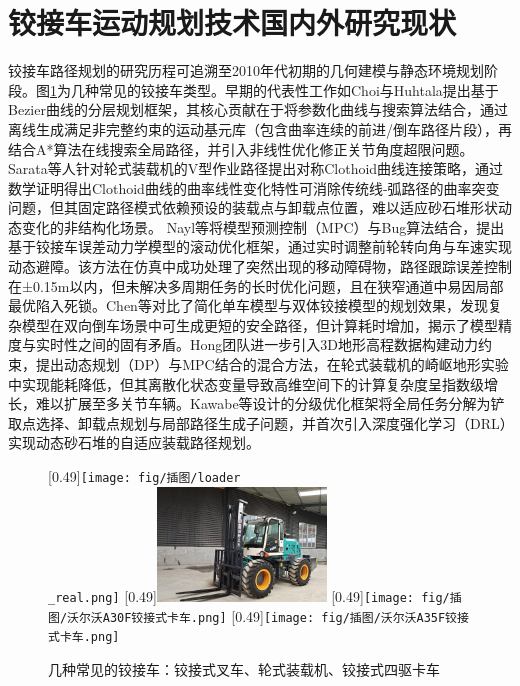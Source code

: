 \documentclass[master,academic]{ysuthesis} %
\begin{document}
	\section{铰接车运动规划技术国内外研究现状}
	铰接车路径规划的研究历程可追溯至2010年代初期的几何建模与静态环境规划阶段。图\ref{fig:几种典型的铰接车案例}为几种常见的铰接车类型。早期的代表性工作如Choi与Huhtala提出基于Bezier曲线的分层规划框架，其核心贡献在于将参数化曲线与搜索算法结合，通过离线生成满足非完整约束的运动基元库（包含曲率连续的前进/倒车路径片段），再结合A*算法在线搜索全局路径，并引入非线性优化修正关节角度超限问题。Sarata等人针对轮式装载机的V型作业路径提出对称Clothoid曲线连接策略，通过数学证明得出Clothoid曲线的曲率线性变化特性可消除传统线-弧路径的曲率突变问题，但其固定路径模式依赖预设的装载点与卸载点位置，难以适应砂石堆形状动态变化的非结构化场景。 Nayl等将模型预测控制（MPC）与Bug算法结合，提出基于铰接车误差动力学模型的滚动优化框架，通过实时调整前轮转向角与车速实现动态避障。该方法在仿真中成功处理了突然出现的移动障碍物，路径跟踪误差控制在±0.15m以内，但未解决多周期任务的长时优化问题，且在狭窄通道中易因局部最优陷入死锁。Chen等对比了简化单车模型与双体铰接模型的规划效果，发现复杂模型在双向倒车场景中可生成更短的安全路径，但计算耗时增加，揭示了模型精度与实时性之间的固有矛盾。Hong团队进一步引入3D地形高程数据构建动力约束，提出动态规划（DP）与MPC结合的混合方法，在轮式装载机的崎岖地形实验中实现能耗降低，但其离散化状态变量导致高维空间下的计算复杂度呈指数级增长，难以扩展至多关节车辆。Kawabe等设计的分级优化框架将全局任务分解为铲取点选择、卸载点规划与局部路径生成子问题，并首次引入深度强化学习（DRL）实现动态砂石堆的自适应装载路径规划。
	\begin{figure}[H]
		\centering
		[0.49\textwidth]{\texttt{[image: fig/插图/loader\\\_real.png]}}
		[0.49\textwidth]{\includegraphics[width=0.4\textwidth]{fig/插图/四驱铰接式叉车.jpg}}
		[0.49\textwidth]{\texttt{[image: fig/插图/沃尔沃A30F铰接式卡车.png]}}
		[0.49\textwidth]{\texttt{[image: fig/插图/沃尔沃A35F铰接式卡车.png]}}
		\caption{几种常见的铰接车：铰接式叉车、轮式装载机、铰接式四驱卡车}
		\label{fig:几种典型的铰接车案例}
	\end{figure}
	
\end{document}
